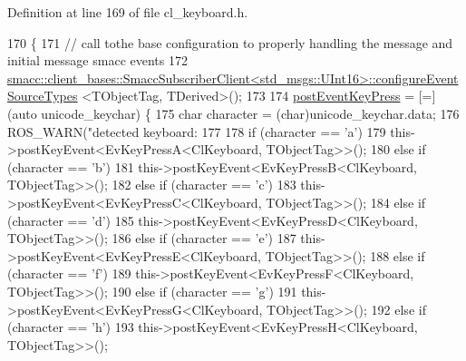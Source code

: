 Definition at line 169 of file cl\+\_\+keyboard.\+h.


\begin{DoxyCode}
170         \{
171                 \textcolor{comment}{// call tothe base configuration to properly handling the message and initial message smacc
       events}
172                 
      \hyperlink{classsmacc_1_1client__bases_1_1SmaccSubscriberClient}{smacc::client\_bases::SmaccSubscriberClient<std\_msgs::UInt16>::configureEventSourceTypes}
      <TObjectTag, TDerived>();
173 
174                 \hyperlink{classkeyboard__client_1_1ClKeyboard_aadd675eea47a012b348a4e6c00e7e9d0}{postEventKeyPress} = [=](\textcolor{keyword}{auto} unicode\_keychar) \{
175                         \textcolor{keywordtype}{char} character = (char)unicode\_keychar.data;
176                         ROS\_WARN(\textcolor{stringliteral}{"detected keyboard: %
177 
178                         \textcolor{keywordflow}{if} (character == \textcolor{charliteral}{'a'})
179                                 this->postKeyEvent<EvKeyPressA<ClKeyboard, TObjectTag>>();
180                         \textcolor{keywordflow}{else} \textcolor{keywordflow}{if} (character == \textcolor{charliteral}{'b'})
181                                 this->postKeyEvent<EvKeyPressB<ClKeyboard, TObjectTag>>();
182                         \textcolor{keywordflow}{else} \textcolor{keywordflow}{if} (character == \textcolor{charliteral}{'c'})
183                                 this->postKeyEvent<EvKeyPressC<ClKeyboard, TObjectTag>>();
184                         \textcolor{keywordflow}{else} \textcolor{keywordflow}{if} (character == \textcolor{charliteral}{'d'})
185                                 this->postKeyEvent<EvKeyPressD<ClKeyboard, TObjectTag>>();
186                         \textcolor{keywordflow}{else} \textcolor{keywordflow}{if} (character == \textcolor{charliteral}{'e'})
187                                 this->postKeyEvent<EvKeyPressE<ClKeyboard, TObjectTag>>();
188                         \textcolor{keywordflow}{else} \textcolor{keywordflow}{if} (character == \textcolor{charliteral}{'f'})
189                                 this->postKeyEvent<EvKeyPressF<ClKeyboard, TObjectTag>>();
190                         \textcolor{keywordflow}{else} \textcolor{keywordflow}{if} (character == \textcolor{charliteral}{'g'})
191                                 this->postKeyEvent<EvKeyPressG<ClKeyboard, TObjectTag>>();
192                         \textcolor{keywordflow}{else} \textcolor{keywordflow}{if} (character == \textcolor{charliteral}{'h'})
193                                 this->postKeyEvent<EvKeyPressH<ClKeyboard, TObjectTag>>();
}
\end{DoxyCode}
